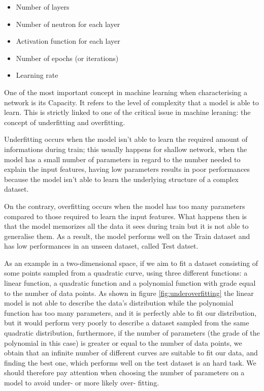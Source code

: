 \documentclass[a4paper,11pt]{article}
\begin{document}
\begin{itemize}
\item Number of layers
\item Number of neutron for each layer
\item Activation function for each layer
\item Number of epochs (or iterations)
\item Learning rate
\end{itemize}




One of the most important concept in machine learning when characterising a network is its Capacity.
It refers to the level of complexity that a model is able to learn.
This is strictly linked to one of the critical issue in machine leraning: the concept of underfitting and overfitting.

Underfitting occurs when the model isn't able to learn the required amount of informations during train; this usually happens for shallow network, when the model has a small number of parameters in regard to the number needed to explain the input features, having low parameters results in poor performances because the model isn't able to learn the underlying structure of a complex dataset.

On the contrary, overfitting occurs when the model has too many parameters compared to those required to learn the input features.
What happens then is that the model memorizes all the data it sees during train but it is not able to generalise them.
As a result, the model performs well on the Train dataset and has low performances in an unseen dataset, called Test datset.

As an example in a two-dimensional space, if we aim to fit a dataset consisting of some points sampled from a quadratic curve, using three different functions: a linear function, a quadratic function and a polynomial function with grade equal to the number of data points.
As shown in figure \ref{fig:underoverfitting} the linear model is not able to describe the data's distribution while the polynomial function has too many parameters, and it is perfectly able to fit our distribution, but it would perform very poorly to describe a dataset sampled from the same quadratic distribution, furthermore, if the number of parameters (the grade of the polynomial in this case) is greater or equal to the number of data points, we obtain that an infinite number of different curves are suitable to fit our data, and finding the best one, which performs well on the test dataset is an hard task.
We should therefore pay attention when choosing the number of parameters on a model to avoid under- or more likely over- fitting.
\end{document}
